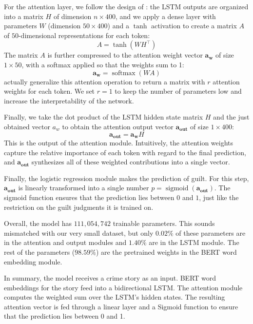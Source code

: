 \documentclass[11pt,a4paper]{article}
\DeclareMathOperator{\softmax}{softmax}
\DeclareMathOperator{\sigmoid}{sigmoid}
\newcommand{\aout}{\mathbf{a_{\text{out}}}}
\begin{document}
For the attention layer, we follow the design of \citeauthor{Lin:2017}: the LSTM outputs are organized into a matrix $H$ of dimension $n \times 400$, and we apply a dense layer with parameters $W$ (dimension $50 \times 400$) and a $\tanh$ activation to create a matrix $A$ of $50$-dimensional representations for each token:
\begin{equation}
  A = \tanh(WH^{\top}) \label{eq:A}
\end{equation}
%
The matrix $A$ is further compressed to the attention weight vector $\mathbf{a_w}$ of size $1 \times 50$, with a softmax applied so that the weights sum to 1:
%
\begin{equation}
  \mathbf{a_w} = \softmax(WA) \label{eq:attn}
\end{equation}
%
\citeauthor{Lin:2017} actually generalize this attention operation to return a matrix with $r$ attention weights for each token. We set $r=1$ to keep the number of parameters low and increase the interpretability of the network.

Finally, we take the dot product of the LSTM hidden state matrix $H$ and the just obtained vector $a_w$ to obtain the attention output vector $\aout$ of size $1 \times 400$:
%
\begin{equation}
  \aout = \mathbf{a_w}H \label{eq:aout}
\end{equation}
%
This is the output of the attention module. Intuitively, the attention weights capture the relative importance of each token with regard to the final prediction, and $\aout$ synthesizes all of these weighted contributions into a single vector.

Finally, the logistic regression module makes the prediction of guilt. For this step, $\aout$ is linearly transformed into a single number $p = \sigmoid(\aout)$. The sigmoid function ensures that the prediction lies between $0$ and $1$, just like the restriction on the guilt judgments it is trained on.

Overall, the model has $111,054,742$ trainable parameters. This sounds mismatched with our very small dataset, but only $0.02\%$ of these parameters are in the attention and output modules and $1.40\%$ are in the LSTM module. The rest of the parameters ($98.59\%$) are the pretrained weights in the BERT word embedding module.

In summary, the model receives a crime story as an input. BERT word embeddings for the story feed into a bidirectional LSTM. The attention module computes the weighted sum over the LSTM's hidden states. The resulting attention vector is fed through a linear layer and a Sigmoid function to ensure that the prediction lies between 0 and 1.
\end{document}
